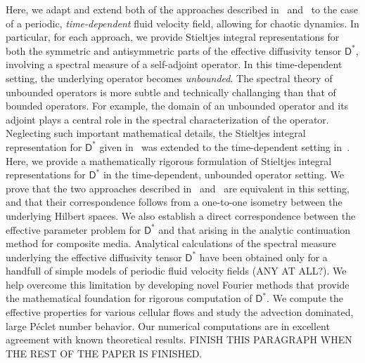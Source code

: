 \documentclass[leqno,onefignum,onetabnum]{siamltex1213}
\newcommand{\Dm}{\mathsf{D}}
\begin{document}
Here, we adapt and extend both of the approaches described
in~\cite{Avellaneda:PRL-753,Avellaneda:CMP-339}
and~\cite{Pavliotis:PHD_Thesis} to the case of a periodic,
\emph{time-dependent} fluid velocity field, allowing for chaotic
dynamics. In particular, for each approach, we provide Stieltjes
integral representations for both the symmetric and antisymmetric
parts of the effective diffusivity tensor $\Dm^*$, involving a
spectral measure of a self-adjoint operator. In this time-dependent
setting, the underlying operator becomes \emph{unbounded}. The
spectral theory of unbounded operators is more subtle and technically
challanging than that of bounded operators. For example, the domain of
an unbounded operator and its adjoint plays a central role in the
spectral characterization of the operator. Neglecting such important
mathematical details, the Stieltjes integral representation for
$\Dm^*$ given in~\cite{Avellaneda:PRL-753,Avellaneda:CMP-339} was
extended to the time-dependent setting
in~\cite{Avellaneda:PRE:3249}. Here, we provide a mathematically
rigorous formulation of Stieltjes integral representations for $\Dm^*$
in the time-dependent, unbounded operator setting. We prove that the
two approaches described
in~\cite{Avellaneda:PRL-753,Avellaneda:CMP-339}
and~\cite{Pavliotis:PHD_Thesis} are equivalent in this setting, and
that their correspondence follows from a one-to-one isometry between
the underlying Hilbert spaces. We also establish a direct
correspondence between the effective parameter problem for $\Dm^*$ and
that arising in the analytic continuation method for composite
media. Analytical calculations of the spectral measure underlying the
effective diffusivity tensor $\Dm^*$ have been obtained
only for a handfull of simple models of periodic fluid velocity
fields (ANY AT ALL?). We help overcome this limitation by developing
novel Fourier methods that provide the mathematical foundation for
rigorous computation of $\Dm^*$. We compute the effective properties
for various cellular flows and study the advection dominated, large
P\'{e}clet number behavior. Our numerical computations are in
excellent agreement with known theoretical results.            
FINISH THIS PARAGRAPH WHEN THE REST OF THE PAPER IS FINISHED.
\end{document}
